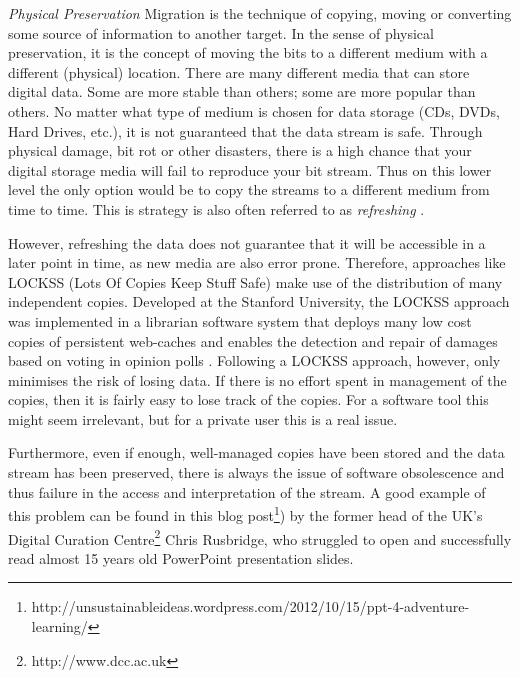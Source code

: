 \textit{Physical Preservation}\newline
Migration is the technique of copying, moving or converting some source of information to another target. In the sense of physical preservation, it is the concept of moving the bits to a different medium with a different (physical) location. There are many different media that can store digital data. Some are more stable than others; some are more popular than others. No matter what type of medium is chosen for data storage (CDs, DVDs, Hard Drives, etc.), it is not guaranteed that the data stream is safe. Through physical damage, bit rot or other disasters, there is a high chance that your digital storage media will fail to reproduce your bit stream. Thus on this lower level the only option would be to copy the streams to a different medium from time to time. This is strategy is also often referred to as \textit{refreshing} \cite{Lee:2002:SOTADP}.

However, refreshing the data does not guarantee that it will be accessible in a later point in time, as new media are also error prone. Therefore, approaches like LOCKSS (Lots Of Copies Keep Stuff Safe) \cite{reich2001lpw} make use of the distribution of many independent copies. Developed at the Stanford University, the LOCKSS approach was implemented in a librarian software system that deploys many low cost copies of persistent web-caches and enables the detection and repair of damages based on voting in opinion polls \cite{Maniatis:2003:PPR:1165389.945451}.
Following a LOCKSS approach, however, only minimises the risk of losing data. If there is no effort spent in management of the copies, then it is fairly easy to lose track of the copies. For a software tool this might seem irrelevant, but for a private user this is a real issue.

Furthermore, even if enough, well-managed copies have been stored and the data stream has been preserved, there is always the issue of software obsolescence and thus failure in the access and interpretation of the stream. A good example of this problem can be found in this blog post\footnote{http://unsustainableideas.wordpress.com/2012/10/15/ppt-4-adventure-learning/}) by the former head of the UK's Digital Curation Centre\footnote{http://www.dcc.ac.uk} Chris Rusbridge, who struggled to open and successfully read almost 15 years old PowerPoint presentation slides. \newline

